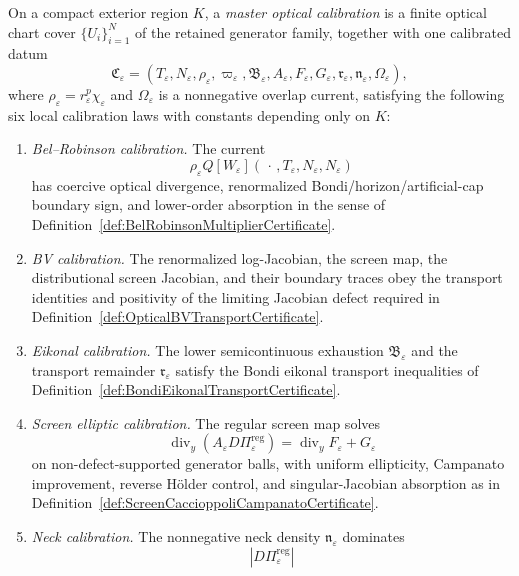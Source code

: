 \begin{definition}\label{def:MasterOpticalCalibration}
On a compact exterior region $K$, a \emph{master optical calibration} is a finite optical chart cover $\{U_i\}_{i=1}^N$ of the retained generator family, together with one calibrated datum
\[
    \mathfrak C_\varepsilon
    =
    \left(
        T_\varepsilon,N_\varepsilon,\rho_\varepsilon,
        \varpi_\varepsilon,\mathfrak B_\varepsilon,
        A_\varepsilon,F_\varepsilon,G_\varepsilon,
        \mathfrak r_\varepsilon,
        \mathfrak n_\varepsilon,
        \Omega_\varepsilon
    \right),
\]
where $\rho_\varepsilon=r_\varepsilon^p\chi_\varepsilon$ and $\Omega_\varepsilon$ is a nonnegative overlap current, satisfying the following six local calibration laws with constants depending only on $K$:
\begin{enumerate}
    \item \emph{Bel--Robinson calibration.} The current
    \[
        \rho_\varepsilon
        Q[W_\varepsilon](\,\cdot\,,T_\varepsilon,N_\varepsilon,N_\varepsilon)
    \]
    has coercive optical divergence, renormalized Bondi/horizon/artificial-cap boundary sign, and lower-order absorption in the sense of Definition~\ref{def:BelRobinsonMultiplierCertificate}.
    \item \emph{BV calibration.} The renormalized log-Jacobian, the screen map, the distributional screen Jacobian, and their boundary traces obey the transport identities and positivity of the limiting Jacobian defect required in Definition~\ref{def:OpticalBVTransportCertificate}.
    \item \emph{Eikonal calibration.} The lower semicontinuous exhaustion $\mathfrak B_\varepsilon$ and the transport remainder $\mathfrak r_\varepsilon$ satisfy the Bondi eikonal transport inequalities of Definition~\ref{def:BondiEikonalTransportCertificate}.
    \item \emph{Screen elliptic calibration.} The regular screen map solves
    \[
        \operatorname{div}_y(A_\varepsilon D\Pi_\varepsilon^{\mathrm{reg}})
        =
        \operatorname{div}_y F_\varepsilon+G_\varepsilon
    \]
    on non-defect-supported generator balls, with uniform ellipticity, Campanato improvement, reverse H\"older control, and singular-Jacobian absorption as in Definition~\ref{def:ScreenCaccioppoliCampanatoCertificate}.
    \item \emph{Neck calibration.} The nonnegative neck density $\mathfrak n_\varepsilon$ dominates
    \[
        |D\Pi_\varepsilon^{\mathrm{reg}}|
\]
\end{enumerate}
\end{definition}
